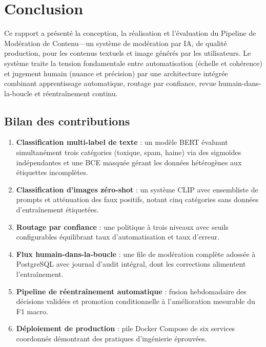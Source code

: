 \chapter{Conclusion}
\label{ch:conclusion}

Ce rapport a présenté la conception, la réalisation et l'évaluation du Pipeline de Modération de Contenu---un système de modération par IA, de qualité production, pour les contenus textuels et image générés par les utilisateurs. Le système traite la tension fondamentale entre automatisation (échelle et cohérence) et jugement humain (nuance et précision) par une architecture intégrée combinant apprentissage automatique, routage par confiance, revue humain-dans-la-boucle et réentraînement continu.

\section{Bilan des contributions}

\begin{enumerate}[nosep]
  \item \textbf{Classification multi-label de texte} : un modèle BERT évaluant simultanément trois catégories (toxique, spam, haine) via des sigmoïdes indépendantes et une BCE masquée gérant les données hétérogènes aux étiquettes incomplètes.
  \item \textbf{Classification d'images zéro-shot} : un système CLIP avec ensembliste de prompts et atténuation des faux positifs, notant cinq catégories sans données d'entraînement étiquetées.
  \item \textbf{Routage par confiance} : une politique à trois niveaux avec seuils configurables équilibrant taux d'automatisation et taux d'erreur.
  \item \textbf{Flux humain-dans-la-boucle} : une file de modération complète adossée à PostgreSQL avec journal d'audit intégral, dont les corrections alimentent l'entraînement.
  \item \textbf{Pipeline de réentraînement automatique} : fusion hebdomadaire des décisions validées et promotion conditionnelle à l'amélioration mesurable du F1 macro.
  \item \textbf{Déploiement de production} : pile Docker Compose de six services coordonnés démontrant des pratiques d'ingénierie éprouvées.
\end{enumerate}

